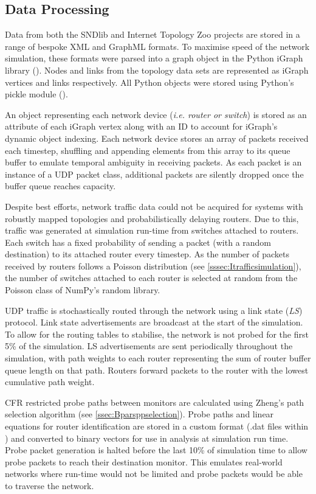 \subsection{Data Processing}
\label{ssec:Mdataprocessing}
Data from both the SNDlib and Internet Topology Zoo projects are stored in a range of bespoke XML and GraphML formats. To maximise speed of the network simulation, these formats were parsed into a graph object in the Python iGraph library (\cite{csardi_igraph_2006}). Nodes and links from the topology data sets are represented as iGraph vertices and links respectively. All Python objects were stored using Python's pickle module (\cite{van_rossum_python_2020}).\par
An object representing each network device (\textit{i.e. router or switch}) is stored as an attribute of each iGraph vertex along with an ID to account for iGraph's dynamic object indexing. Each network device stores an array of packets received each timestep, shuffling and appending elements from this array to its queue buffer to emulate temporal ambiguity in receiving packets. As each packet is an instance of a UDP packet class, additional packets are silently dropped once the buffer queue reaches capacity.\par
Despite best efforts, network traffic data could not be acquired for systems with robustly mapped topologies and probabilistically delaying routers. Due to this, traffic was generated at simulation run-time from switches attached to routers. Each switch has a fixed probability of sending a packet (with a random destination) to its attached router every timestep. As the number of packets received by routers follows a Poisson distribution (see \cref{sssec:Itrafficsimulation}), the number of switches attached to each router is selected at random from the Poisson class of NumPy's random library.\par
UDP traffic is stochastically routed through the network using a link state (\textit{LS}) protocol. Link state advertisements are broadcast at the start of the simulation. To allow for the routing tables to stabilise, the network is not probed for the first 5\% of the simulation. LS advertisements are sent periodically throughout the simulation, with path weights to each router representing the sum of router buffer queue length on that path. Routers forward packets to the router with the lowest cumulative path weight.\par
CFR restricted probe paths between monitors are calculated using Zheng's path selection algorithm (see \cref{ssec:Bparsppselection}). Probe paths and linear equations for router identification are stored in a custom format (.dat files within \cite{sylvester_millar_real_2021}) and converted to binary vectors for use in analysis at simulation run time. Probe packet generation is halted before the last 10\% of simulation time to allow probe packets to reach their destination monitor. This emulates real-world networks where run-time would not be limited and probe packets would be able to traverse the network.\par
